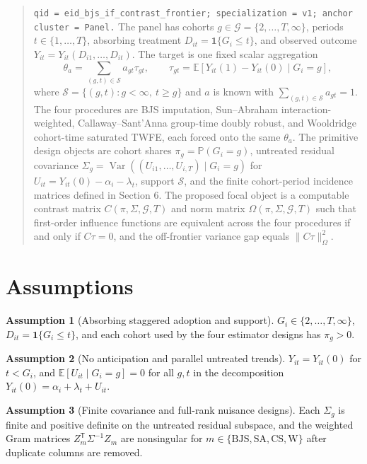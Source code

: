\documentclass[11pt]{article}
\newcommand{\E}{\mathbb{E}}
\renewcommand{\Pr}{\mathbb{P}}
\newcommand{\one}{\mathbf{1}}
\newcommand{\transpose}{\mathsf{T}}
\theoremstyle{definition}
\newtheorem{assumption}{Assumption}
\theoremstyle{plain}
\theoremstyle{remark}
\begin{document}
\begin{quote}
\texttt{qid = eid\_bjs\_if\_contrast\_frontier; specialization = v1; anchor cluster = Panel.}
The panel has cohorts $g\in\mathcal G=\{2,\ldots,T,\infty\}$, periods
$t\in\{1,\ldots,T\}$, absorbing treatment $D_{it}=\one\{G_i\le t\}$, and
observed outcome $Y_{it}=Y_{it}(D_{i1},\ldots,D_{it})$.  The target is one
fixed scalar aggregation
\[
  \theta_a=\sum_{(g,t)\in\mathcal S} a_{gt}\tau_{gt},\qquad
  \tau_{gt}=\E[Y_{it}(1)-Y_{it}(0)\mid G_i=g],
\]
where $\mathcal S=\{(g,t):g<\infty,\ t\ge g\}$ and $a$ is known with
$\sum_{(g,t)\in\mathcal S}a_{gt}=1$.  The four procedures are BJS imputation,
Sun--Abraham interaction-weighted, Callaway--Sant'Anna group-time doubly
robust, and Wooldridge cohort-time saturated TWFE, each forced onto the same
$\theta_a$.  The primitive design objects are cohort shares
$\pi_g=\Pr(G_i=g)$, untreated residual covariance
$\Sigma_g=\operatorname{Var}((U_{i1},\ldots,U_{i,T})\mid G_i=g)$ for
$U_{it}=Y_{it}(0)-\alpha_i-\lambda_t$, support $\mathcal S$, and the finite
cohort-period incidence matrices defined in Section 6.  The proposed focal
object is a computable contrast matrix $C(\pi,\Sigma,\mathcal G,T)$ and norm
matrix $\Omega(\pi,\Sigma,\mathcal G,T)$ such that first-order influence
functions are equivalent across the four procedures if and only if
$C\tau=0$, and the off-frontier variance gap equals
$\|C\tau\|_{\Omega}^{2}$.
\end{quote}

\section{Assumptions}
\begin{assumption}[Absorbing staggered adoption and support]\label{ass:support}
$G_i\in\{2,\ldots,T,\infty\}$, $D_{it}=\one\{G_i\le t\}$, and each cohort
used by the four estimator designs has $\pi_g>0$.
\end{assumption}

\begin{assumption}[No anticipation and parallel untreated trends]\label{ass:pt}
$Y_{it}=Y_{it}(0)$ for $t<G_i$, and
$\E[U_{it}\mid G_i=g]=0$ for all $g,t$ in the decomposition
$Y_{it}(0)=\alpha_i+\lambda_t+U_{it}$.
\end{assumption}

\begin{assumption}[Finite covariance and full-rank nuisance designs]\label{ass:rank}
Each $\Sigma_g$ is finite and positive definite on the untreated residual
subspace, and the weighted Gram matrices
$Z_m^\transpose\Sigma^{-1}Z_m$ are nonsingular for
$m\in\{\mathrm{BJS},\mathrm{SA},\mathrm{CS},\mathrm{W}\}$ after duplicate
columns are removed.
\end{assumption}
\end{document}
